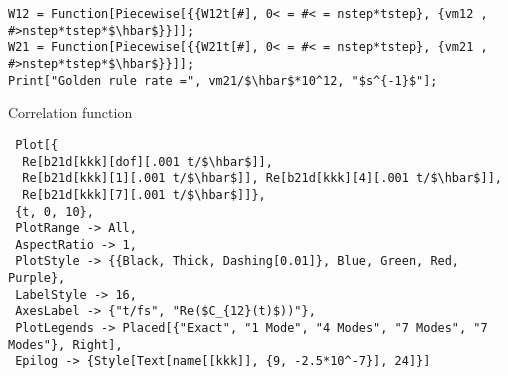 \begin{itemize}[leftmargin = *]
\begin{lstlisting}
W12 = Function[Piecewise[{{W12t[#], 0< = #< = nstep*tstep}, {vm12 , #>nstep*tstep*$\hbar$}}]];
W21 = Function[Piecewise[{{W21t[#], 0< = #< = nstep*tstep}, {vm21 , #>nstep*tstep*$\hbar$}}]];
Print["Golden rule rate =", vm21/$\hbar$*10^12, "$s^{-1}$"];
\end{lstlisting}
\large{Correlation function}
\begin{lstlisting}
 Plot[{
  Re[b21d[kkk][dof][.001 t/$\hbar$]],
  Re[b21d[kkk][1][.001 t/$\hbar$]], Re[b21d[kkk][4][.001 t/$\hbar$]],
  Re[b21d[kkk][7][.001 t/$\hbar$]]},
 {t, 0, 10},
 PlotRange -> All,
 AspectRatio -> 1,
 PlotStyle -> {{Black, Thick, Dashing[0.01]}, Blue, Green, Red, Purple},
 LabelStyle -> 16,
 AxesLabel -> {"t/fs", "Re($C_{12}(t)$))"},
 PlotLegends -> Placed[{"Exact", "1 Mode", "4 Modes", "7 Modes", "7 Modes"}, Right],
 Epilog -> {Style[Text[name[[kkk]], {9, -2.5*10^-7}], 24]}]
\end{lstlisting}

\end{itemize}
